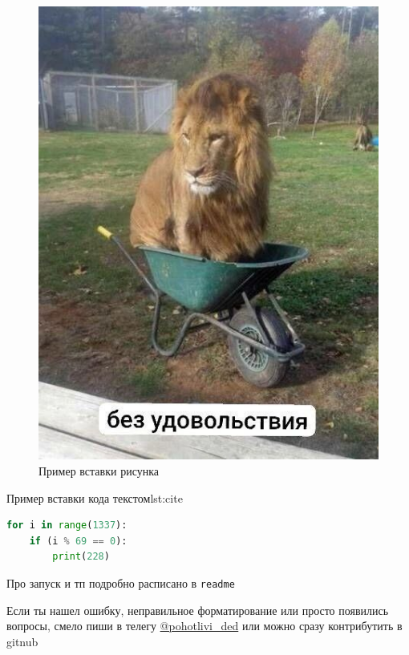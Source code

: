 \begin{figure}[H]
    \centering
    \includegraphics[width=150mm]{images/lev}
    \caption{Пример вставки рисунка}
    \label{fig:lev}
\end{figure}


\begin{codeblockenv}{Пример вставки кода текстом}{lst:cite}
    \begin{lstlisting}[language=Python,frame=single]
for i in range(1337):
    if (i % 69 == 0):
        print(228)
    \end{lstlisting}
\end{codeblockenv}

Про запуск и тп подробно расписано в \texttt{readme}

Если ты нашел ошибку, неправильное форматирование или просто появились вопросы, смело пиши в телегу \href{https://t.me/pohotlivi_ded}{@pohotlivi_ded} или можно сразу контрибутить в gitnub
